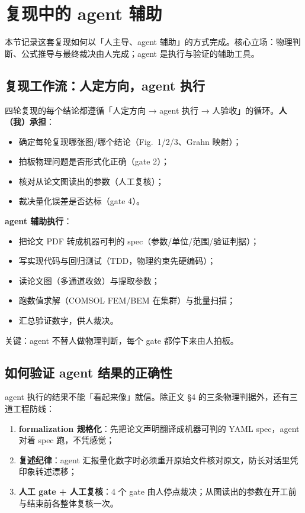 \section{复现中的 agent 辅助}

本节记录这套复现如何以「人主导、agent 辅助」的方式完成。核心立场：物理判断、公式推导与最终裁决由人完成；agent 是执行与验证的辅助工具。

\subsection{复现工作流：人定方向，agent 执行}

四轮复现的每个结论都遵循「人定方向 → agent 执行 → 人验收」的循环。\textbf{人（我）承担}：

\begin{itemize}
  \item 确定每轮复现哪张图/哪个结论（Fig.~1/2/3、Grahn 映射）；
  \item 拍板物理问题是否形式化正确（\textcolor{annotblue}{gate 2}）；
  \item 核对从论文图读出的参数（人工复核）；
  \item 裁决量化误差是否达标（\textcolor{annotblue}{gate 4}）。
\end{itemize}

\textbf{agent 辅助执行}：

\begin{itemize}
  \item 把论文 PDF 转成机器可判的 spec（参数/单位/范围/验证判据）；
  \item 写实现代码与回归测试（TDD，物理约束先硬编码）；
  \item 读论文图（多通道收敛）与提取参数；
  \item 跑数值求解（COMSOL FEM/BEM 在集群）与批量扫描；
  \item 汇总验证数字，供人裁决。
\end{itemize}

关键：agent 不替人做物理判断，每个 gate 都停下来由人拍板。

\subsection{如何验证 agent 结果的正确性}

agent 执行的结果不能「看起来像」就信。除正文 §4 的三条物理判据外，还有三道工程防线：

\begin{enumerate}
  \item \textbf{formalization 规格化}：先把论文声明翻译成机器可判的 YAML spec，agent 对着 spec 跑，不凭感觉；
  \item \textbf{复述纪律}：agent 汇报量化数字时必须重开原始文件核对原文，防长对话里凭印象转述漂移；
  \item \textbf{人工 gate + 人工复核}：4 个 gate 由人停点裁决；从图读出的参数在开工前与结束前各整体复核一次。
\end{enumerate}

